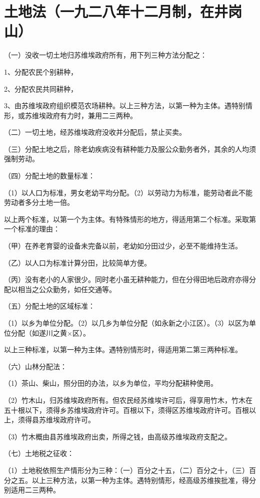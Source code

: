 \section[土地法（一九二八年十二月制，在井岗山）]{土地法（一九二八年十二月制，在井岗山）}


（一）没收一切土地归苏维埃政府所有，用下列三种方法分配之：

1、分配农民个别耕种，

2、分配农民共同耕种，

3、由苏维埃政府组织模范农场耕种。以上三种方法，以第一种为主体。遇特别情形，或苏维埃政府有力时，兼用二三两种。

（二）一切土地，经苏维埃政府没收并分配后，禁止买卖。

（三）分配土地之后，除老幼疾病没有耕种能力及服公众勤务者外，其余的人均须强制劳动。

（四）分配土地的数量标准：

（1）以人口为标准，男女老幼平均分配。（2）以劳动力为标准，能劳动者此不能劳动者多分土地一倍。

以上两个标准，以第一个为主体。有特殊情形的地方，得适用第二个标准。采取第一个标准的理由：

（甲）在养老育婴的设备未完备以前，老幼如分田过少，必至不能维持生活。

（乙）以人口为标准计算分田，比较简单方便。

（丙）没有老小的人家很少。同时老小虽无耕种能力，但在分得田地后政府亦得分配以相当之公众勤务，如任交通等。

（五）分配土地的区域标准：

（1）以乡为单位分配。（2）以几乡为单位分配（如永新之小江区）。（3）以区为单位分配（如遂川之黄×区）。

以上三种标准，以第一种为主体。遇特别情形时，得适用第二第三两种标准。

（六）山林分配法：

（1）茶山、柴山，照分田的办法，以乡为单位，平均分配耕种使用。

（2）竹木山，归苏维埃政府所有。但农民经苏维埃许可后，得享用竹木，竹木在五十根以下，须得乡苏维埃政府许可。百根以下，须得区苏维埃政府许可。百根以上，须得县苏维埃政府许可。

（3）竹木概由县苏维埃政府出卖，所得之钱，由高级苏维埃政府支配之。

（七）土地税之征收：

（1）土地税依照生产情形分为三种：（一）百分之十五，（二）百分之十，（三）百分之五。以上三种方法，以第一种为主体。遇特别情形，经高级苏维挨批准，得分别适用二三两种。

